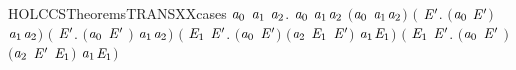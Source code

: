 \begin{SaveVerbatim}{HOLCCSTheoremsTRANSXXcases}
\HOLTokenTurnstile{} \HOLSymConst{\HOLTokenForall{}}\ensuremath{\HOLBoundVar{a}\sb{\mathrm{0}}} \ensuremath{\HOLBoundVar{a}\sb{\mathrm{1}}} \ensuremath{\HOLBoundVar{a}\sb{\mathrm{2}}}.
     \ensuremath{\HOLBoundVar{a}\sb{\mathrm{0}}} \HOLTokenTransBegin\ensuremath{\HOLBoundVar{a}\sb{\mathrm{1}}}\HOLTokenTransEnd \ensuremath{\HOLBoundVar{a}\sb{\mathrm{2}}} \HOLSymConst{\HOLTokenEquiv{}}
     \ensuremath{(}\ensuremath{\HOLBoundVar{a}\sb{\mathrm{0}}} \HOLSymConst{\ensuremath{=}} \ensuremath{\HOLBoundVar{a}\sb{\mathrm{1}}}\HOLSymConst{\ensuremath{\ldotp}}\ensuremath{\HOLBoundVar{a}\sb{\mathrm{2}}}\ensuremath{)} \HOLSymConst{\HOLTokenDisj{}} \ensuremath{(}\HOLSymConst{\HOLTokenExists{}} \ensuremath{\HOLBoundVar{E}\sp{\prime{}}}. \ensuremath{(}\ensuremath{\HOLBoundVar{a}\sb{\mathrm{0}}} \HOLSymConst{\ensuremath{=}}  \HOLSymConst{\ensuremath{+}} \ensuremath{\HOLBoundVar{E}\sp{\prime{}}}\ensuremath{)} \HOLSymConst{\HOLTokenConj{}}  \HOLTokenTransBegin\ensuremath{\HOLBoundVar{a}\sb{\mathrm{1}}}\HOLTokenTransEnd \ensuremath{\HOLBoundVar{a}\sb{\mathrm{2}}}\ensuremath{)} \HOLSymConst{\HOLTokenDisj{}}
     \ensuremath{(}\HOLSymConst{\HOLTokenExists{}} \ensuremath{\HOLBoundVar{E}\sp{\prime{}}}. \ensuremath{(}\ensuremath{\HOLBoundVar{a}\sb{\mathrm{0}}} \HOLSymConst{\ensuremath{=}} \ensuremath{\HOLBoundVar{E}\sp{\prime{}}} \HOLSymConst{\ensuremath{+}} \ensuremath{)} \HOLSymConst{\HOLTokenConj{}}  \HOLTokenTransBegin\ensuremath{\HOLBoundVar{a}\sb{\mathrm{1}}}\HOLTokenTransEnd \ensuremath{\HOLBoundVar{a}\sb{\mathrm{2}}}\ensuremath{)} \HOLSymConst{\HOLTokenDisj{}}
     \ensuremath{(}\HOLSymConst{\HOLTokenExists{}} \ensuremath{\HOLBoundVar{E}\sb{\mathrm{1}}} \ensuremath{\HOLBoundVar{E}\sp{\prime{}}}. \ensuremath{(}\ensuremath{\HOLBoundVar{a}\sb{\mathrm{0}}} \HOLSymConst{\ensuremath{=}}  \HOLSymConst{\ensuremath{\mid}} \ensuremath{\HOLBoundVar{E}\sp{\prime{}}}\ensuremath{)} \HOLSymConst{\HOLTokenConj{}} \ensuremath{(}\ensuremath{\HOLBoundVar{a}\sb{\mathrm{2}}} \HOLSymConst{\ensuremath{=}} \ensuremath{\HOLBoundVar{E}\sb{\mathrm{1}}} \HOLSymConst{\ensuremath{\mid}} \ensuremath{\HOLBoundVar{E}\sp{\prime{}}}\ensuremath{)} \HOLSymConst{\HOLTokenConj{}}  \HOLTokenTransBegin\ensuremath{\HOLBoundVar{a}\sb{\mathrm{1}}}\HOLTokenTransEnd \ensuremath{\HOLBoundVar{E}\sb{\mathrm{1}}}\ensuremath{)} \HOLSymConst{\HOLTokenDisj{}}
     \ensuremath{(}\HOLSymConst{\HOLTokenExists{}} \ensuremath{\HOLBoundVar{E}\sb{\mathrm{1}}} \ensuremath{\HOLBoundVar{E}\sp{\prime{}}}. \ensuremath{(}\ensuremath{\HOLBoundVar{a}\sb{\mathrm{0}}} \HOLSymConst{\ensuremath{=}} \ensuremath{\HOLBoundVar{E}\sp{\prime{}}} \HOLSymConst{\ensuremath{\mid}} \ensuremath{)} \HOLSymConst{\HOLTokenConj{}} \ensuremath{(}\ensuremath{\HOLBoundVar{a}\sb{\mathrm{2}}} \HOLSymConst{\ensuremath{=}} \ensuremath{\HOLBoundVar{E}\sp{\prime{}}} \HOLSymConst{\ensuremath{\mid}} \ensuremath{\HOLBoundVar{E}\sb{\mathrm{1}}}\ensuremath{)} \HOLSymConst{\HOLTokenConj{}}  \HOLTokenTransBegin\ensuremath{\HOLBoundVar{a}\sb{\mathrm{1}}}\HOLTokenTransEnd \ensuremath{\HOLBoundVar{E}\sb{\mathrm{1}}}\ensuremath{)} \HOLSymConst{\HOLTokenDisj{}}

\end{SaveVerbatim}
